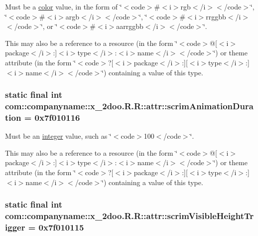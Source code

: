 Must be a \hyperlink{classcom_1_1companyname_1_1x__2doo_1_1_r_1_1color}{color} value, in the form of \char`\"{}$<$code$>$\#$<$i$>$rgb$<$/i$>$$<$/code$>$\char`\"{}, \char`\"{}$<$code$>$\#$<$i$>$argb$<$/i$>$$<$/code$>$\char`\"{}, \char`\"{}$<$code$>$\#$<$i$>$rrggbb$<$/i$>$$<$/code$>$\char`\"{}, or \char`\"{}$<$code$>$\#$<$i$>$aarrggbb$<$/i$>$$<$/code$>$\char`\"{}. 

This may also be a reference to a resource (in the form \char`\"{}$<$code$>$@\mbox{[}$<$i$>$package$<$/i$>$:\mbox{]}$<$i$>$type$<$/i$>$:$<$i$>$name$<$/i$>$$<$/code$>$\char`\"{}) or theme attribute (in the form \char`\"{}$<$code$>$?\mbox{[}$<$i$>$package$<$/i$>$:\mbox{]}\mbox{[}$<$i$>$type$<$/i$>$:\mbox{]}$<$i$>$name$<$/i$>$$<$/code$>$\char`\"{}) containing a value of this type. \hypertarget{classcom_1_1companyname_1_1x__2doo_1_1_r_1_1attr_7151504f26bbcbbe9139f585e5da23c4}{
\subsubsection[{scrimAnimationDuration}]{\setlength{\rightskip}{0pt plus 5cm}static final int com::companyname::x\_\-2doo.R.R::attr::scrimAnimationDuration = 0x7f010116}}
\label{classcom_1_1companyname_1_1x__2doo_1_1_r_1_1attr_7151504f26bbcbbe9139f585e5da23c4}


Must be an \hyperlink{classcom_1_1companyname_1_1x__2doo_1_1_r_1_1integer}{integer} value, such as \char`\"{}$<$code$>$100$<$/code$>$\char`\"{}. 

This may also be a reference to a resource (in the form \char`\"{}$<$code$>$@\mbox{[}$<$i$>$package$<$/i$>$:\mbox{]}$<$i$>$type$<$/i$>$:$<$i$>$name$<$/i$>$$<$/code$>$\char`\"{}) or theme attribute (in the form \char`\"{}$<$code$>$?\mbox{[}$<$i$>$package$<$/i$>$:\mbox{]}\mbox{[}$<$i$>$type$<$/i$>$:\mbox{]}$<$i$>$name$<$/i$>$$<$/code$>$\char`\"{}) containing a value of this type. \hypertarget{classcom_1_1companyname_1_1x__2doo_1_1_r_1_1attr_e30bed9d129005bc4a7490f97568b438}{
\subsubsection[{scrimVisibleHeightTrigger}]{\setlength{\rightskip}{0pt plus 5cm}static final int com::companyname::x\_\-2doo.R.R::attr::scrimVisibleHeightTrigger = 0x7f010115}}
\label{classcom_1_1companyname_1_1x__2doo_1_1_r_1_1attr_e30bed9d129005bc4a7490f97568b438}


